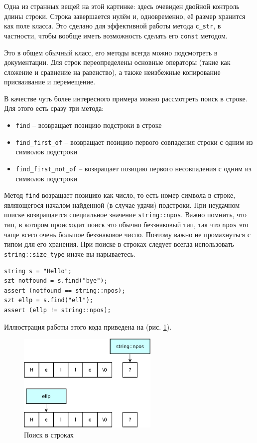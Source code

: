 \documentclass[a4paper,12pt,oneside]{book}
\begin{document}
Одна из странных вещей на этой картинке: здесь очевиден двойной контроль длины строки. Строка завершается нулём и, одновременно, её размер хранится как поле класса. Это сделано для эффективной работы метода \lstinline!c_str!, в частности, чтобы вообще иметь возможность сделать его \lstinline!const! методом.

Это в общем обычный класс, его методы всегда можно подсмотреть в документации. Для строк переопределены основные операторы (такие как сложение и сравнение на равенство), а также неизбежные копирование присваивание и перемещение.

В качестве чуть более интересного примера можно рассмотреть поиск в строке. Для этого есть сразу три метода:

\begin{itemize}
\item \lstinline!find! -- возвращает позицию подстроки в строке
\item \lstinline!find_first_of! -- возвращает позицию первого совпадения строки с одним из символов подстроки
\item \lstinline!find_first_not_of! -- возвращает позицию первого несовпадения с одним из символов подстроки
\end{itemize}

Метод \lstinline!find! возращает позицию как число, то есть номер символа в строке, являющегося началом найденной (в случае удачи) подстроки. При неудачном поиске возвращается специальное значение \lstinline!string::npos!. Важно помнить, что тип, в котором происходит поиск это обычно беззнаковый тип, так что \lstinline!npos! это чаще всего очень большое беззнаковое число. Поэтому важно не промахнуться с типом для его хранения. При поиске в строках следует всегда использовать \lstinline!string::size_type! иначе вы нарываетесь.

\begin{lstlisting}
string s = "Hello"; 
szt notfound = s.find("bye"); 
assert (notfound == string::npos); 
szt ellp = s.find("ell"); 
assert (ellp != string::npos); 
\end{lstlisting}

Иллюстрация работы этого кода приведена на (рис. \ref{fig:string-find}). 

\begin{figure}[ht]
\centering
\includegraphics[width=0.6\textwidth]{illustrations/string-find-crop.pdf}
\caption{Поиск в строках}
\label{fig:string-find}
\end{figure}
\end{document}
